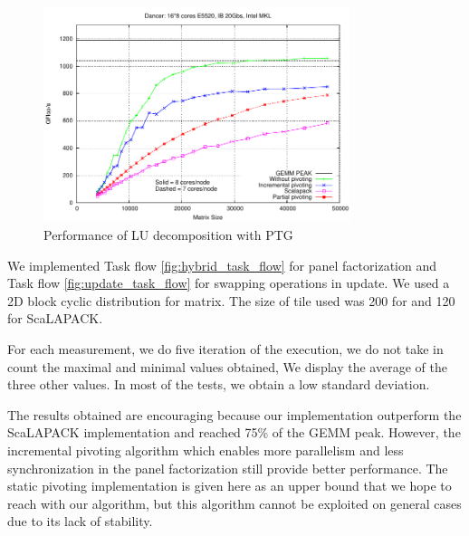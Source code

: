 \begin{figure}
\centering
\includegraphics[width=0.8\textwidth]{figures/gepp.pdf}
\caption{Performance of LU decomposition with PTG\label{fig:pp}} 
\end{figure}

 
We implemented Task flow \ref{fig:hybrid_task_flow} for panel factorization and Task flow \ref{fig:update_task_flow} for swapping operations in update. 
We used a 2D block cyclic distribution for matrix. The size of tile used was 200 for \dague and 120 for ScaLAPACK.

For each measurement, we do five iteration of the execution, we do not take in count the maximal and minimal values obtained, We display the average of the three other values. In most of the tests, we obtain a low standard deviation.

The results obtained are encouraging  because our implementation outperform the ScaLAPACK implementation and reached 75\% of the GEMM peak.
However, the incremental pivoting algorithm which enables more parallelism and less synchronization in the panel factorization still provide better performance.
The static pivoting implementation is given here as an upper bound that we hope to reach with our algorithm, but this algorithm cannot be exploited on general cases due to its lack of stability. 



